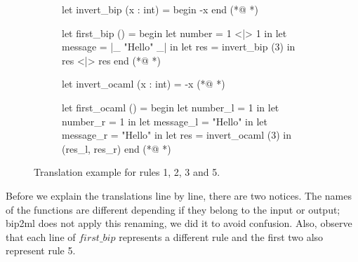 \begin{figure}[h]
  \centering

  \begin{subfigure}[t]{0.49\textwidth}
    \centering
    \noindent
    \begin{biplangenv}


let invert_bip (x : int) = begin
  -x
end
(*@ *)

let first_bip () = begin
  let number = 1 <|> 1 in
  let message = |_ "Hello" _| in
  let res = invert_bip (3) in
  res <|> res
end
(*@ *)
    \end{biplangenv}
  \end{subfigure}
  \hfill
  \begin{subfigure}[t]{0.49\textwidth}
    \centering
    \noindent
    \begin{gospel}


let invert_ocaml (x : int) =
  -x 
(*@ *)

let first_ocaml () = begin
  let number_l = 1 in
  let number_r = 1 in
  let message_l = "Hello" in
  let message_r = "Hello" in
  let res = invert_ocaml (3) in
  (res_l, res_r)
end
(*@ *)
    \end{gospel}
  \end{subfigure}
  \caption{Translation example for rules 1, 2, 3 and 5.}
  \label{fig:trans_ex_first}
\end{figure}

Before we explain the translations line by line, there are two notices.
The names of the functions are different depending if they belong to the input or output; bip2ml does not apply this renaming, we did it to avoid confusion.
Also, observe that each line of $first\_bip$ represents a different rule and the first two also represent rule 5.

